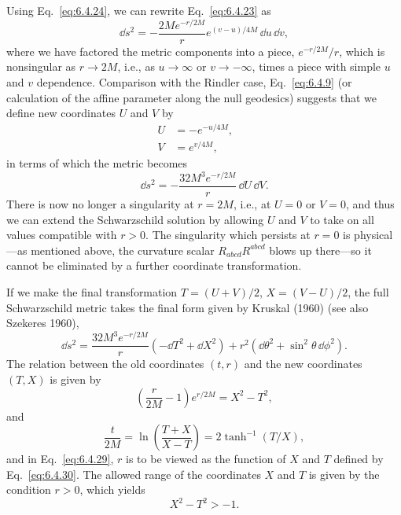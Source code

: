 Using Eq.~\eqref{eq:6.4.24}, we can rewrite Eq.~\eqref{eq:6.4.23} as
\begin{equation}
  \dd s^2=-\frac{2Me^{-r/2M}}{r}e^{(v-u)/4M}\,\dd u\,\dd v,
  \tag{6.4.25}\label{eq:6.4.25}
\end{equation}
where we have factored the metric components into a piece,
\(e^{-r/2M}/r\), which is nonsingular as \(r\to2M\), i.e., as \(u\to\infty\)
or \(v\to-\infty\), times a piece with simple \(u\) and \(v\) dependence.
Comparison with the Rindler case, Eq.~\eqref{eq:6.4.9} (or calculation of the
affine parameter along the null geodesics) suggests that we define new
coordinates \(U\) and \(V\) by
\begin{align}
  U&=-e^{-u/4M},
  &&\tag{6.4.26}\label{eq:6.4.26}\\
  V&=e^{v/4M},
  &&\tag{6.4.27}\label{eq:6.4.27}
\end{align}
in terms of which the metric becomes
\begin{equation}
  \dd s^2=-\frac{32M^3e^{-r/2M}}{r}\,\dd U\,\dd V.
  \tag{6.4.28}\label{eq:6.4.28}
\end{equation}
There is now no longer a singularity at \(r=2M\), i.e., at \(U=0\) or \(V=0\),
and thus we can extend the Schwarzschild solution by allowing \(U\) and \(V\) to
take on all values compatible with \(r>0\). The singularity which persists at
\(r=0\) is physical---as mentioned above, the curvature scalar
\(R_{abcd}R^{abcd}\) blows up there---so it cannot be eliminated by a further
coordinate transformation.

If we make the final transformation \(T=(U+V)/2\), \(X=(V-U)/2\), the full
Schwarzschild metric takes the final form given by Kruskal (1960) (see also
Szekeres 1960),
\begin{equation}
  \dd s^2=\frac{32M^3e^{-r/2M}}{r}(-\dd T^2+\dd X^2)
  +r^2(\dd\theta^2+\sin^2\theta\,\dd\phi^2).
  \tag{6.4.29}\label{eq:6.4.29}
\end{equation}
The relation between the old coordinates \((t,r)\) and the new coordinates
\((T,X)\) is given by
\begin{equation}
  \left(\frac{r}{2M}-1\right)e^{r/2M}=X^2-T^2,
  \tag{6.4.30}\label{eq:6.4.30}
\end{equation}
and
\begin{equation}
  \frac{t}{2M}=\ln\left(\frac{T+X}{X-T}\right)
  =2\tanh^{-1}(T/X),
  \tag{6.4.31}\label{eq:6.4.31}
\end{equation}
and in Eq.~\eqref{eq:6.4.29}, \(r\) is to be viewed as the function of \(X\) and
\(T\) defined by Eq.~\eqref{eq:6.4.30}. The allowed range of the coordinates
\(X\) and \(T\) is given by the condition \(r>0\), which yields
\begin{equation}
  X^2-T^2>-1.
  \tag{6.4.32}\label{eq:6.4.32}
\end{equation}

